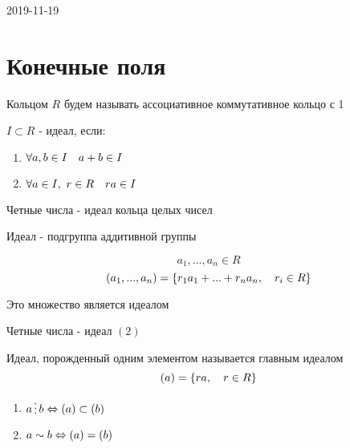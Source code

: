 \documentclass[main.tex]{subfiles}
\begin{document}
\begin{lect}{2019-11-19}
    \section{Конечные поля}
    Кольцом $R$ будем называть ассоциативное коммутативное кольцо с 1
    \begin{definition}
        $I \subset R$ - идеал, если:
        \begin{enumerate}
          \item $\forall a,b \in I \quad a + b \in I$
          \item $\forall a \in I,\ r \in R \quad ra \in I$
        \end{enumerate}
    \end{definition}

    \begin{example}
        Четные числа - идеал кольца целых чисел
    \end{example}

    \begin{remark}

        Идеал - подгруппа аддитивной группы
    \end{remark}

    \begin{Definition}[конструкция]
        \[a_1,..., a_n \in R\]
        \[(a_1,...,a_n) = \{ r_1 a_1 + ... + r_n a_n,\quad r_i \in R\} \]
    \end{Definition}

    \begin{utv}
        Это множество является идеалом
    \end{utv}

    \begin{example}
        Четные числа - идеал $(2)$
    \end{example}

    \begin{definition}
        Идеал, порожденный одним элементом называется главным идеалом
        \[(a) = \{ ra,\quad r \in R\}\]
    \end{definition}

    \begin{properties}
        \begin{enumerate}
          \item $a \devides b \lra (a) \subset (b)$
          \item $a \sim b \Leftrightarrow (a) = (b)$
        \end{enumerate}
    \end{properties}


\end{lect}
\end{document}
